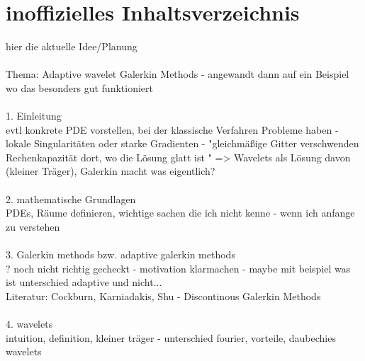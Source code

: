 \documentclass[a4paper,11pt,bibliography=totoc,listof=totoc,headinclude=true,cleardoublepage=empty,oneside]{scrbook}
\begin{document}

\tableofcontents

\cleardoublepage
{} 


\chapter{inoffizielles Inhaltsverzeichnis}
\noindent 
hier die aktuelle Idee/Planung 
\\
\\ Thema: Adaptive wavelet Galerkin Methods - angewandt dann auf ein Beispiel wo das besonders gut funktioniert
\\
\\ 1. Einleitung 
\\ evtl konkrete PDE vorstellen, bei der klassische Verfahren Probleme haben - lokale Singularitäten oder starke Gradienten - "gleichmäßige Gitter verschwenden Rechenkapazität dort, wo die Lösung glatt ist "  => Wavelets als Lösung davon (kleiner Träger), Galerkin macht was eigentlich?
\\
\\  2. mathematische Grundlagen 
\\ PDEs, Räume definieren, wichtige sachen die ich nicht kenne - wenn ich anfange zu verstehen
\\
\\  3. Galerkin methods bzw. adaptive galerkin methods 
\\ ? noch nicht richtig gecheckt - motivation klarmachen - maybe mit beispiel was ist unterschied adaptive und nicht...
\\ Literatur: Cockburn, Karniadakis, Shu - Discontinous Galerkin Methods
\\
\\  4. wavelets 
\\ intuition, definition, kleiner träger - unterschied fourier, vorteile, daubechies wavelets
\end{document}
